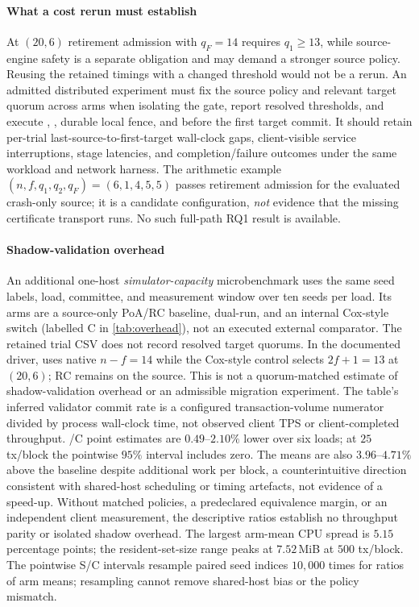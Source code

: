 \paragraph{What a cost rerun must establish}
At $(20,6)$ retirement admission with $q_F=14$ requires $q_1\ge13$, while source-engine safety is
a separate obligation and may demand a stronger source policy. Reusing the retained timings with
a changed threshold would not be a rerun. An admitted distributed experiment must fix the source
policy and relevant target quorum across arms when isolating the gate, report resolved thresholds,
and execute \CutCert, \ManCert, durable local fence, and \FenceCert{} before the first
target commit. It should retain per-trial last-source-to-first-target wall-clock gaps, client-visible
service interruptions, stage latencies, and completion/failure outcomes under the same workload and
network harness. The arithmetic example $(n,f,q_1,q_2,q_F)=(6,1,4,5,5)$ passes retirement
admission for the evaluated crash-only source; it is a candidate configuration, \emph{not}
evidence that the missing certificate transport runs. No such full-path RQ1 result is available.

\paragraph{Shadow-validation overhead}
An additional one-host \emph{simulator-capacity} microbenchmark uses the same
seed labels, load, committee, and measurement window over ten seeds per load.
Its arms are a source-only PoA/RC baseline, \sage{} dual-run, and an internal
Cox-style switch (labelled C in \cref{tab:overhead}), not an executed external
comparator. The retained trial CSV does not record resolved target quorums.
In the documented driver, \sage{} uses native $n-f=14$ while the Cox-style
control selects $2f+1=13$ at $(20,6)$; RC remains on the source. This is not
a quorum-matched estimate of shadow-validation overhead or an admissible
migration experiment. The table's inferred validator commit rate is a
configured transaction-volume numerator divided by process wall-clock time,
not observed client TPS or client-completed throughput. \sage{}/C point estimates are
$0.49$--$2.10\%$ lower over six loads; at $25$ tx/block the pointwise $95\%$
interval includes zero. The \sage{} means are also $3.96$--$4.71\%$ above
the baseline despite additional work per block, a counterintuitive direction
consistent with shared-host scheduling or timing artefacts, not evidence of a
speed-up. Without matched policies, a predeclared equivalence margin, or an
independent client measurement, the descriptive ratios establish no throughput
parity or isolated shadow overhead. The largest arm-mean CPU spread is $5.15$
percentage points; the resident-set-size range peaks at $7.52$\,MiB at
$500$ tx/block. The pointwise S/C intervals resample paired seed indices
$10{,}000$ times for ratios of arm means; resampling cannot remove shared-host
bias or the policy mismatch.


